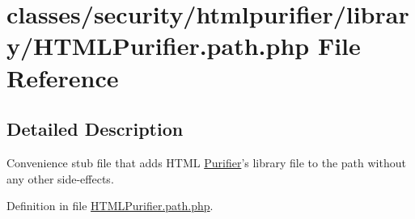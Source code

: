 \hypertarget{HTMLPurifier_8path_8php}{\section{classes/security/htmlpurifier/library/\+H\+T\+M\+L\+Purifier.path.\+php File Reference}
\label{HTMLPurifier_8path_8php}
}


\subsection{Detailed Description}
Convenience stub file that adds H\+T\+M\+L \hyperlink{classPurifier}{Purifier}'s library file to the path without any other side-\/effects. 

Definition in file \hyperlink{HTMLPurifier_8path_8php_source}{H\+T\+M\+L\+Purifier.\+path.\+php}.

